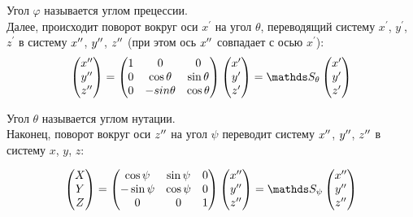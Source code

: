 Угол $\varphi$ называется углом прецессии.\\

\hspace{0.48cm} Далее, происходит поворот вокруг оси $x^\prime$ на угол $\theta$, переводящий систему $x^\prime$, $y^\prime$, $z^\prime$ в систему $x^{\prime \prime}$, $y^{\prime \prime}$, $z^{\prime \prime}$ (при этом ось $x^{\prime \prime}$ совпадает с осью $x^{\prime}$):
\begin{gather}
\begin{pmatrix}
x^{\dpr} \\
y^{\dpr} \\
z^{\dpr} 
\end{pmatrix} = 
\begin{pmatrix}
1 & 0 & 0 \\
0 & \cos \theta & \sin \theta \\
0 & - sin \theta & \cos \theta
\end{pmatrix}
\begin{pmatrix}
x^\prime \\
y^\prime \\
z^\prime
\end{pmatrix} = 
\bbS_\theta
\begin{pmatrix}
x^\prime \\
y^\prime \\
z^\prime
\end{pmatrix} \notag
\end{gather}   

Угол $\theta$ называется углом нутации.\\

\hspace{0.48cm} Наконец, поворот вокруг оси $z^{\prime \prime}$ на угол $\psi$ переводит систему $x^{\prime \prime}$, $y^{\prime \prime}$, $z^{\prime \prime}$ в систему $x$, $y$, $z$:

\begin{gather}
\begin{pmatrix}
X \\
Y \\
Z
\end{pmatrix} =
\begin{pmatrix}
\cos \psi & \sin \psi & 0 \\
- \sin \psi & \cos \psi & 0 \\
0 & 0 & 1
\end{pmatrix}
\begin{pmatrix}
x^{\dpr} \\
y^{\dpr} \\
z^{\dpr}
\end{pmatrix} = 
\bbS_\psi 
\begin{pmatrix}
x^{\dpr} \\
y^{\dpr} \\
z^{\dpr}
\end{pmatrix} \notag
\end{gather}

